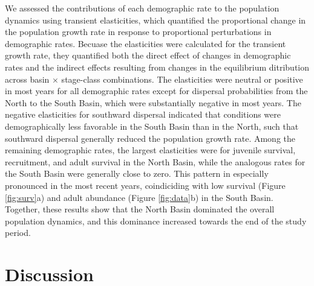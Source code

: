 \documentclass[11pt]{article}
\begin{document}
We assessed the contributions of each demographic rate to the population dynamics
using transient elasticities,
which quantified the proportional change in the population growth rate in 
response to proportional perturbations in demographic rates.
Becuase the elasticities were calculated for the transient growth rate,
they quantified both the direct effect of changes in demographic rates 
and the indirect effects resulting from changes in the equilibrium ditribution
across basin $\times$ stage-class combinations.
The elasticities were neutral or positive in most years for all demographic rates 
except for dispersal probabilities from the North to the South Basin,
which were substantially negative in most years.
The negative elasticities for southward dispersal indicated that conditions were 
demographically less favorable in the South Basin than in the North,
such that southward dispersal generally reduced the population growth rate.
Among the remaining demographic rates,
the largest elasticities were for juvenile survival, recruitment, and adult survival
in the North Basin, while the analogous rates for the South Basin were generally close to zero.
This pattern in especially pronounced in the most recent years,
coindiciding with low survival (Figure \ref{fig:surv}a) 
and adult abundance (Figure \ref{fig:data}b) in the South Basin.
Together, these results show that the North Basin dominated 
the overall population dynamics, 
and this dominance increased towards the end of the study period.








\section*{Discussion}






\end{document}
